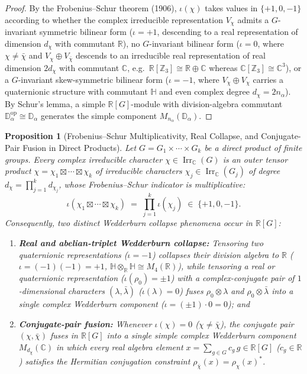 \documentclass[11pt,a4paper]{article}
\newtheorem{proposition}[theorem]{Proposition}
\theoremstyle{definition}
\theoremstyle{remark}
\newcommand{\R}{\mathbb{R}}
\newcommand{\C}{\mathbb{C}}
\newcommand{\quat}{\mathbb{H}}
\newcommand{\Z}{\mathbb{Z}}
\newcommand{\Irr}{\operatorname{Irr}}
\begin{document}
\begin{proof}
By the Frobenius--Schur theorem (1906), $\iota(\chi)$ takes values in $\{+1, 0, -1\}$ according to whether the complex irreducible representation $V_\chi$ admits a $G$-invariant symmetric bilinear form ($\iota = +1$, descending to a real representation of dimension $d_\chi$ with commutant $\R$), no $G$-invariant bilinear form ($\iota = 0$, where $\chi \neq \bar{\chi}$ and $V_\chi \oplus V_{\bar{\chi}}$ descends to an irreducible real representation of real dimension $2d_\chi$ with commutant $\C$, e.g.\ $\R[\Z_3] \cong \R \oplus \C$ whereas $\C[\Z_3] \cong \C^3$), or a $G$-invariant skew-symmetric bilinear form ($\iota = -1$, where $V_\chi \oplus V_\chi$ carries a quaternionic structure with commutant $\quat$ and even complex degree $d_\chi = 2n_\alpha$). By Schur's lemma, a simple $\R[G]$-module with division-algebra commutant $\mathbb{D}_\alpha^{\mathrm{op}} \cong \mathbb{D}_\alpha$ generates the simple component $M_{n_\alpha}(\mathbb{D}_\alpha)$.
\end{proof}

\begin{proposition}[Frobenius--Schur Multiplicativity, Real Collapse, and Conjugate-Pair Fusion in Direct Products]
\label{prop:fs_tensor_reality}
Let $G = G_1 \times \cdots \times G_k$ be a direct product of finite groups. Every complex irreducible character $\chi \in \Irr_{\C}(G)$ is an outer tensor product $\chi = \chi_1 \boxtimes \cdots \boxtimes \chi_k$ of irreducible characters $\chi_j \in \Irr_{\C}(G_j)$ of degree $d_\chi = \prod_{j=1}^k d_{\chi_j}$, whose Frobenius--Schur indicator is multiplicative:
\begin{equation}
\label{eq:fs_multiplicative}
\iota(\chi_1 \boxtimes \cdots \boxtimes \chi_k) \;=\; \prod_{j=1}^k \iota(\chi_j) \;\in\; \{+1, 0, -1\}.
\end{equation}
Consequently, two distinct Wedderburn collapse phenomena occur in $\R[G]$:
\begin{enumerate}
    \item \textbf{Real and abelian-triplet Wedderburn collapse:} Tensoring two quaternionic representations ($\iota = -1$) collapses their division algebra to $\R$ ($\iota = (-1)(-1) = +1$, $\quat \otimes_{\R} \quat \cong M_4(\R)$), while tensoring a real or quaternionic representation ($\iota(\rho_0) = \pm 1$) with a complex-conjugate pair of $1$-dimensional characters $(\lambda, \bar{\lambda})$ ($\iota(\lambda) = 0$) fuses $\rho_0 \otimes \lambda$ and $\rho_0 \otimes \bar{\lambda}$ into a single complex Wedderburn component ($\iota = (\pm 1)\cdot 0 = 0$); and
    \item \textbf{Conjugate-pair fusion:} Whenever $\iota(\chi) = 0$ ($\chi \neq \bar{\chi}$), the conjugate pair $(\chi, \bar{\chi})$ fuses in $\R[G]$ into a single simple complex Wedderburn component $M_{d_\chi}(\C)$ in which every real algebra element $x = \sum_{g \in G} c_g\,g \in \R[G]$ ($c_g \in \R$) satisfies the Hermitian conjugation constraint $\rho_{\bar{\chi}}(x) = \rho_\chi(x)^*$.
\end{enumerate}
\end{proposition}
\end{document}
